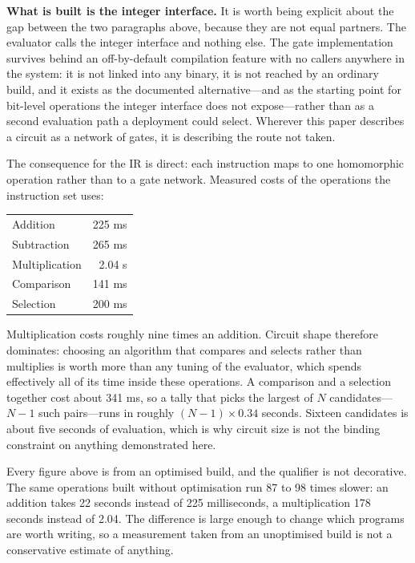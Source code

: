 \documentclass[12pt,a4paper]{article}
\begin{document}
\textbf{What is built is the integer interface.}
It is worth being explicit about the gap between the two paragraphs above, because they are not equal partners.
The evaluator calls the integer interface and nothing else.
The gate implementation survives behind an off-by-default compilation feature with no callers anywhere in the system: it is not linked into any binary, it is not reached by an ordinary build, and it exists as the documented alternative---and as the starting point for bit-level operations the integer interface does not expose---rather than as a second evaluation path a deployment could select.
Wherever this paper describes a circuit as a network of gates, it is describing the route not taken.

The consequence for the IR is direct: each instruction maps to one homomorphic operation rather than to a gate network.
Measured costs of the operations the instruction set uses:

\begin{center}
\begin{tabular}{lr}
\hline
Addition & 225 ms \\
Subtraction & 265 ms \\
Multiplication & 2.04 s \\
Comparison & 141 ms \\
Selection & 200 ms \\
\hline
\end{tabular}
\end{center}

Multiplication costs roughly nine times an addition.
Circuit shape therefore dominates: choosing an algorithm that compares and selects rather than multiplies is worth more than any tuning of the evaluator, which spends effectively all of its time inside these operations.
A comparison and a selection together cost about 341 ms, so a tally that picks the largest of $N$ candidates---$N - 1$ such pairs---runs in roughly $(N-1) \times 0.34$ seconds.
Sixteen candidates is about five seconds of evaluation, which is why circuit size is not the binding constraint on anything demonstrated here.

Every figure above is from an optimised build, and the qualifier is not decorative.
The same operations built without optimisation run 87 to 98 times slower: an addition takes 22 seconds instead of 225 milliseconds, a multiplication 178 seconds instead of 2.04.
The difference is large enough to change which programs are worth writing, so a measurement taken from an unoptimised build is not a conservative estimate of anything.
\end{document}
